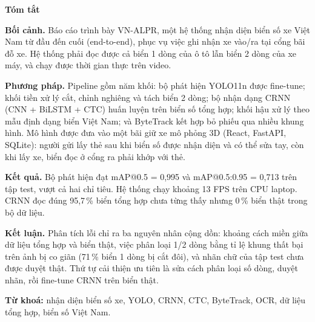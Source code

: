 \begin{center}
  {\LARGE\bfseries Tóm tắt\par}
\end{center}
\vspace{1em}
\begingroup
\large\linespread{1.35}\selectfont
\setlength{\parskip}{0.9em}

\textbf{Bối cảnh.} Báo cáo trình bày VN-ALPR, một hệ thống nhận diện biển số xe Việt Nam từ đầu đến cuối (end-to-end), phục vụ việc ghi nhận xe vào/ra tại cổng bãi đỗ xe. Hệ thống phải đọc được cả biển 1 dòng của ô tô lẫn biển 2 dòng của xe máy, và chạy được thời gian thực trên video.

\textbf{Phương pháp.} Pipeline gồm năm khối: bộ phát hiện YOLO11n được fine-tune; khối tiền xử lý cắt, chỉnh nghiêng và tách biển 2 dòng; bộ nhận dạng CRNN (CNN + BiLSTM + CTC) huấn luyện trên biển số tổng hợp; khối hậu xử lý theo mẫu định dạng biển Việt Nam; và ByteTrack kết hợp bỏ phiếu qua nhiều khung hình. Mô hình được đưa vào một bãi giữ xe mô phỏng 3D (React, FastAPI, SQLite): người gửi lấy thẻ sau khi biển số được nhận diện và có thể sửa tay, còn khi lấy xe, biển đọc ở cổng ra phải khớp với thẻ.

\textbf{Kết quả.} Bộ phát hiện đạt mAP@0.5 = 0,995 và mAP@0.5:0.95 = 0,713 trên tập test, vượt cả hai chỉ tiêu. Hệ thống chạy khoảng 13 FPS trên CPU laptop. CRNN đọc đúng 95,7\,\% biển tổng hợp chưa từng thấy nhưng 0\,\% biển thật trong bộ dữ liệu.

\textbf{Kết luận.} Phân tích lỗi chỉ ra ba nguyên nhân cộng dồn: khoảng cách miền giữa dữ liệu tổng hợp và biển thật, việc phân loại 1/2 dòng bằng tỉ lệ khung thất bại trên ảnh bị co giãn (71\,\% biển 1 dòng bị cắt đôi), và nhãn chữ của tập test chưa được duyệt thật. Thứ tự cải thiện ưu tiên là sửa cách phân loại số dòng, duyệt nhãn, rồi fine-tune CRNN trên biển thật.

\vspace{0.5em}
\textbf{Từ khoá:} nhận diện biển số xe, YOLO, CRNN, CTC, ByteTrack, OCR, dữ liệu tổng hợp, biển số Việt Nam.
\par\endgroup
\newpage
